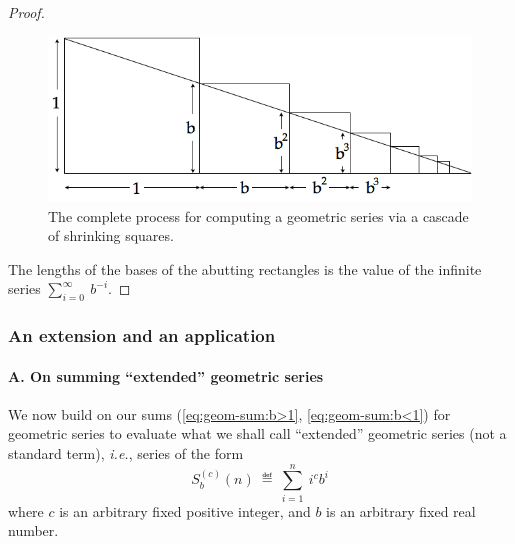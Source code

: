 \begin{proof}
\begin{figure}[h]
\begin{center}
       \includegraphics[scale=0.4]{FiguresMaths/SumGeometricGeneral3}
\caption{The complete process for computing a geometric series via a
  cascade of shrinking squares.}
       \label{fig:sumGeoGeneral3}
\end{center}
\end{figure}
The lengths of the bases of the abutting rectangles is the value of
the infinite series $\displaystyle \sum_{i=0}^\infty \ b^{-i}$.
\end{proof}



\subsubsection{An extension and an application}
\label{sec:extended-geom-series}

\paragraph{\small\sf A. On summing ``extended'' geometric series}

We now build on our sums (\ref{eq:geom-sum:b>1},
\ref{eq:geom-sum:b<1}) for geometric series to evaluate what we shall
call ``extended'' geometric series (not a standard term), \textit{i.e.}, series
of the form
\[ S_b^{(c)}(n) \ \eqdef \ \sum_{i=1}^n \ i^c b^i \]
where $c$ is an arbitrary fixed positive integer, and $b$ is an
arbitrary fixed real number.

